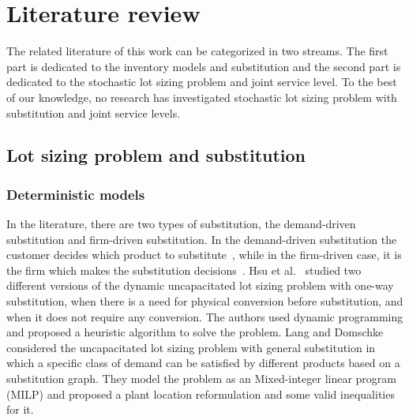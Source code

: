 \documentclass[10pt]{article}
\begin{document}
\section{Literature review}
The related literature of this work can be categorized in two streams. The first part is dedicated to the inventory models and substitution and the second part is dedicated to the stochastic lot sizing problem and joint service level. To the best of our knowledge, no research has investigated stochastic lot sizing problem with substitution and joint service levels.

\subsection{Lot sizing problem and substitution}
\subsubsection{Deterministic models}
In the literature, there are two types of substitution, the demand-driven substitution and firm-driven substitution. In the demand-driven substitution the customer decides which product to substitute~\cite{zeppetella2017optimal}, while in the firm-driven case, it is the firm which makes the substitution decisions~\cite{rao2004multi}. Hsu et al.~\cite{hsu2005dynamic} studied two different versions of the dynamic uncapacitated lot sizing problem with one-way substitution, when there is a need for physical conversion before substitution, and when it does not require any conversion. The authors used dynamic programming and proposed a heuristic algorithm to solve the problem.  Lang and Domschke~\cite{lang2010efficient} considered the uncapacitated lot sizing problem with general substitution in which a specific class of demand can be satisfied by different products based on a substitution graph. They model the problem as an Mixed-integer linear program (MILP) and proposed a plant location reformulation and some valid inequalities for it.
\end{document}
